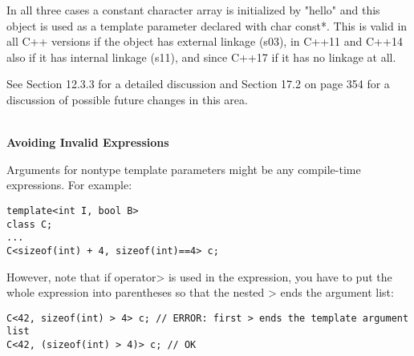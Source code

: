 In all three cases a constant character array is initialized by "hello" and this object is used as a template parameter declared with char const*. This is valid in all C++ versions if the object has external linkage (s03), in C++11 and C++14 also if it has internal linkage (s11), and since C++17 if it has no linkage at all.

See Section 12.3.3 for a detailed discussion and Section 17.2 on page 354 for a discussion of possible future changes in this area.

\hspace*{\fill} \\ %
\noindent
\textbf{Avoiding Invalid Expressions}

Arguments for nontype template parameters might be any compile-time expressions. For example:

\begin{lstlisting}[style=styleCXX]
template<int I, bool B>
class C;
...
C<sizeof(int) + 4, sizeof(int)==4> c;
\end{lstlisting}

However, note that if operator> is used in the expression, you have to put the whole expression into parentheses so that the nested > ends the argument list:

\begin{lstlisting}[style=styleCXX]
C<42, sizeof(int) > 4> c; // ERROR: first > ends the template argument list
C<42, (sizeof(int) > 4)> c; // OK
\end{lstlisting}











